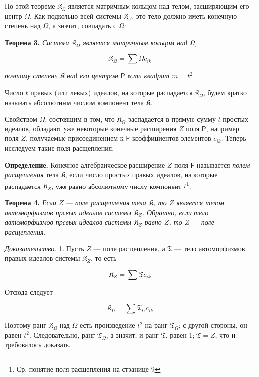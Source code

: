 \documentclass[11pt]{article}
\newcommand{\srcfn}[2]{\footnote{#2}}
\begin{document}
По этой теореме \(\mathfrak K_\Omega\) является матричным кольцом над телом, расширяющим его центр \(\Omega\). Как подкольцо всей системы \(\mathfrak K_\Omega\), это тело должно иметь конечную степень над \(\Omega\), а значит, совпадать с \(\Omega\):

\textbf{Теорема 3.} \emph{Система \(\mathfrak K_\Omega\) является матричным кольцом над \(\Omega\),}

\[
\mathfrak K_\Omega=\sum\Omega c_{ik}
\]

\emph{поэтому степень \(\mathfrak K\) над его центром \(\mathsf P\) есть квадрат \(m=t^2\).}

Число \(t\) правых (или левых) идеалов, на которые распадается \(\mathfrak K_\Omega\), будем кратко называть абсолютным числом компонент тела \(\mathfrak K\).

Свойством \(\Omega\), состоящим в том, что \(\mathfrak K_\Omega\) распадается в прямую сумму \(t\) простых идеалов, обладают уже некоторые конечные расширения \(Z\) поля \(\mathsf P\), например поля \(Z\), получаемые присоединением к \(\mathsf P\) коэффициентов элементов \(c_{ik}\). Теперь исследуем такие поля расщепления.

\textbf{Определение.} Конечное алгебраическое расширение \(Z\) поля \(\mathsf P\) называется \emph{полем расщепления} тела \(\mathfrak K\), если число простых правых идеалов, на которые распадается \(\mathfrak K_Z\), уже равно абсолютному числу компонент \(t\)\srcfn{1}{Ср. понятие поля расщепления на странице 9}.

\textbf{Теорема 4.} \emph{Если \(Z\) --- поле расщепления тела \(\mathfrak K\), то \(Z\) является телом автоморфизмов правых идеалов системы \(\mathfrak K_Z\). Обратно, если тело автоморфизмов правых идеалов системы \(\mathfrak K_Z\) равно \(Z\), то \(Z\) --- поле расщепления.}

\emph{Доказательство.} 1. Пусть \(Z\) --- поле расщепления, а \(\mathfrak T\) --- тело автоморфизмов правых идеалов системы \(\mathfrak K_Z\), то есть

\[
\mathfrak K_Z=\sum\mathfrak T c_{ik}
\]

Отсюда следует

\[
\mathfrak K_\Omega=\sum\mathfrak T_\Omega c_{ik}
\]

Поэтому ранг \(\mathfrak K_\Omega\) над \(\Omega\) есть произведение \(t^2\) на ранг \(\mathfrak T_\Omega\); с другой стороны, он равен \(t^2\). Следовательно, ранг \(\mathfrak T_\Omega\), а значит, и ранг \(\mathfrak T\), равен 1; \(\mathfrak T=Z\), что и требовалось доказать.
\end{document}
